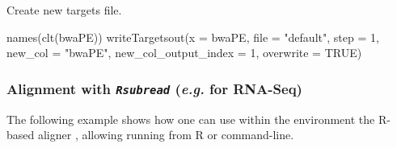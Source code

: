 \documentclass[14pt,]{article}
\newcommand{\hlnum}[1]{\textcolor[rgb]{0.816,0.125,0.439}{#1}}%
\newcommand{\hlstr}[1]{\textcolor[rgb]{0.251,0.627,0.251}{#1}}%
\newcommand{\hlstd}[1]{\textcolor[rgb]{0.251,0.251,0.251}{#1}}%
\newcommand{\hlkwc}[1]{\textcolor[rgb]{0.251,0.251,0.251}{#1}}%
\newcommand{\hlkwd}[1]{\textcolor[rgb]{0.878,0.439,0.125}{#1}}%
\newenvironment{Shaded}{\begin{myshaded}}{\end{myshaded}}
\newcommand{\KeywordTok}[1]{\hlkwd{#1}}
\newcommand{\DataTypeTok}[1]{\hlkwc{#1}}
\newcommand{\DecValTok}[1]{\hlnum{#1}}
\newcommand{\StringTok}[1]{\hlstr{#1}}
\newcommand{\OtherTok}[1]{{#1}}
\newcommand{\NormalTok}[1]{\hlstd{#1}}
\begin{document}
Create new targets file.

\begin{Shaded}
\begin{Highlighting}[]
\KeywordTok{names}\NormalTok{(}\KeywordTok{clt}\NormalTok{(bwaPE))}
\KeywordTok{writeTargetsout}\NormalTok{(}\DataTypeTok{x =}\NormalTok{ bwaPE, }\DataTypeTok{file =} \StringTok{"default"}\NormalTok{, }\DataTypeTok{step =} \DecValTok{1}\NormalTok{, }\DataTypeTok{new_col =} \StringTok{"bwaPE"}\NormalTok{, }\DataTypeTok{new_col_output_index =} \DecValTok{1}\NormalTok{, }
    \DataTypeTok{overwrite =} \OtherTok{TRUE}\NormalTok{)}
\end{Highlighting}
\end{Shaded}

\hypertarget{alignment-with-rsubread-e.g.-for-rna-seq}{%
\subsubsection{\texorpdfstring{Alignment with \emph{\texttt{Rsubread}} (\emph{e.g.} for RNA-Seq)}{Alignment with Rsubread (e.g. for RNA-Seq)}}\label{alignment-with-rsubread-e.g.-for-rna-seq}}

The following example shows how one can use within the  environment the R-based aligner , allowing running from R or command-line.
\end{document}
